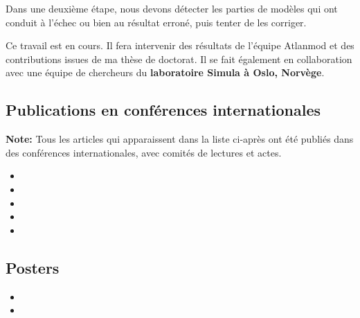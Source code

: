Dans une deuxième étape, nous devons détecter les parties de modèles qui ont conduit à l'échec ou bien au résultat erroné, puis tenter de les corriger.

Ce travail est en cours. Il fera intervenir des résultats de l'équipe Atlanmod et des contributions issues de ma thèse de doctorat. Il se fait également en collaboration avec une équipe de chercheurs du {\bf laboratoire Simula à Oslo, Norvège}.


\subsection{Publications en conférences internationales}

{\bf Note:} Tous les articles qui apparaissent dans la liste ci-après ont été publiés dans des conférences internationales, avec comités de lectures et actes. 


\begin{itemize}
\vspace{2mm}
\item {}
\vspace{2mm}
\item {}
\vspace{2mm}
\item {}
\vspace{2mm}
\item {}
\vspace{2mm}
\item {}
\vspace{2mm}
\end{itemize}
\subsection{Posters}

\begin{itemize}
\item {}
\vspace{1mm}
\item {}
\end{itemize}

